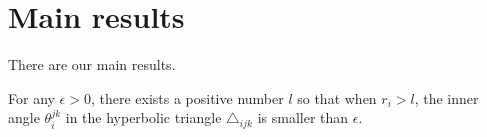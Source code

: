 %

\chapter{Main results}

There are our main results.

\begin{lemma}
   \leanok
  For any $\epsilon>0$, there exists a positive number $l$ so that when $r_{i}>l$,
  the inner angle $\theta_{i}^{jk}$ in the hyperbolic triangle $\triangle_{ijk}$
  is smaller than $\epsilon$.
\end{lemma}
